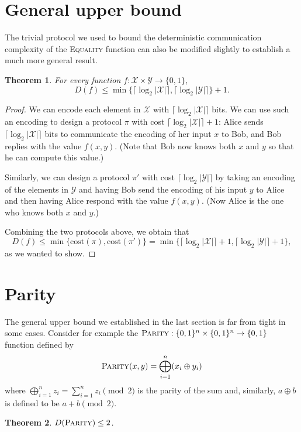 \documentclass[11pt,oneside]{book}
\theoremstyle{plain}
\newtheorem{theorem}{Theorem}
\theoremstyle{definition}
\theoremstyle{plain}
\newcommand{\calX}{\mathcal{X}}
\newcommand{\calY}{\mathcal{Y}}
\newcommand{\cost}{\mathrm{cost}}
\begin{document}
\section{General upper bound}
The trivial protocol we used to bound the deterministic communication complexity of the \textsc{Equality} function can also be modified slightly to establish a much more general result.

\begin{theorem}
	For every function $f : \mathcal{X} \times \mathcal{Y} \to \{0,1\}$, 
	\[
	D(f) \le \min\{\lceil \log_2 |\mathcal{X}| \rceil, \lceil \log_2 |\mathcal{Y}| \rceil\} + 1.
	\]
\end{theorem}

\begin{proof}
	We can encode each element in $\calX$ with $\lceil \log_2 |\mathcal{X}| \rceil$ bits. We can use such an encoding to design a protocol $\pi$ with cost $\lceil \log_2 |\mathcal{X}| \rceil + 1$: Alice sends $\lceil \log_2 |\mathcal{X}| \rceil$ bits to communicate the encoding of her input $x$ to Bob, and Bob replies with the value $f(x,y)$. (Note that Bob now knows both $x$ and $y$ so that he can compute this value.)
	
	Similarly, we can design a protocol $\pi'$ with cost $\lceil \log_2 |\mathcal{Y}| \rceil$ by taking an encoding of the elements in $\calY$ and having Bob send the encoding of his input $y$ to Alice and then having Alice respond with the value $f(x,y)$. (Now Alice is the one who knows both $x$ and $y$.)
	
	Combining the two protocols above, we obtain that
	\[
	D(f) \le \min\{ \cost(\pi), \cost(\pi') \} = \min\{\lceil \log_2 |\mathcal{X}| \rceil + 1, \lceil \log_2 |\mathcal{Y}| \rceil + 1\},
	\]
	as we wanted to show.
\end{proof}


\section{Parity}
The general upper bound we established in the last section is far from tight in some cases. Consider for example the $\textsc{Parity} : \{0,1\}^n \times \{0,1\}^n \to \{0,1\}$ function defined by
\[
\textsc{Parity}(x,y) = \bigoplus_{i=1}^n (x_i \oplus y_i) 
\]
where $\bigoplus_{i=1}^n z_i = \sum_{i=1}^n z_i \pmod{2}$ is the parity of the sum and, similarly, $a \oplus b$ is defined to be $a+b \pmod{2}$.

\begin{theorem}
	$D(\textsc{Parity}) \le 2$.
\end{theorem}
\end{document}
